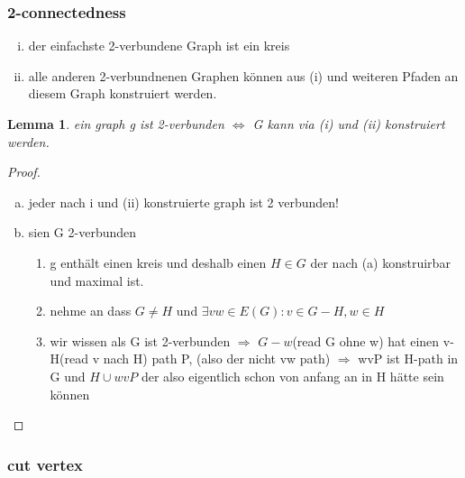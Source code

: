 \documentclass[a4paper]{article}
\newtheorem{lemma}[theorem]{Lemma}
\theoremstyle{definition}
\theoremstyle{remark}
\begin{document}
\subsubsection{2-connectedness}
\label{ssub:2_connectedness}
\begin{enumerate}[(i)]
  \item der einfachste 2-verbundene Graph ist ein kreis
  \item alle anderen 2-verbundnenen Graphen können aus (i) und weiteren Pfaden an diesem Graph konstruiert werden.
\end{enumerate}
\begin{lemma}
  ein graph g ist 2-verbunden $\Leftrightarrow$ G kann via (i) und (ii) konstruiert werden.  
\end{lemma}
\begin{proof}
  \begin{enumerate}[(a)]
    \item jeder nach i und (ii) konstruierte graph ist 2 verbunden!
    \item sien G 2-verbunden
      \begin{enumerate}
	\item g enthält einen kreis und deshalb einen $H\in G$ der nach (a) konstruirbar und maximal ist.
	\item nehme an dass $G\neq H$ und $\exists vw\in E(G): v\in G-H, w\in H$
	\item wir wissen als G ist 2-verbunden $\Rightarrow$ $G-w$(read G ohne w) hat einen v-H(read v nach H) path P, (also der nicht vw path) $\Rightarrow$ wvP ist H-path in G und $H \cup wvP$ der also eigentlich schon von anfang an in H hätte sein können  
      \end{enumerate}
  \end{enumerate}
\end{proof}
\subsubsection{cut vertex}
\label{ssub:cut_vertex}
\end{document}
